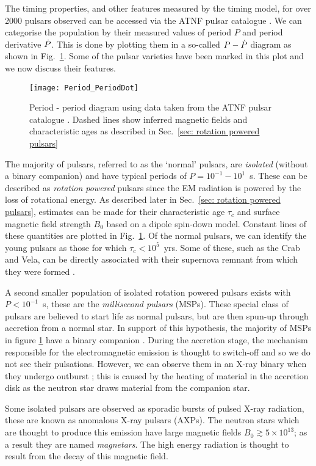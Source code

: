 The timing properties, and other features measured by the timing model, for
over 2000 pulsars observed can be accessed via the ATNF pulsar catalogue
\citep{ATNF}.  We can categorise the population by their measured values of
period $P$ and period derivative $\dot{P}$. This is done by plotting them in a
so-called $P - \dot{P}$ diagram as shown in Fig.~\ref{fig: Period_PeriodDot}.
Some of the pulsar varieties have been marked in this plot and we now discuss
their features.

\begin{figure}[hb]
    \centering
    \texttt{[image: Period\_PeriodDot]}
    \caption{Period - period diagram using data taken from the ATNF pulsar
             catalogue \citep{ATNF}. Dashed lines show inferred magnetic fields
             and characteristic ages as described in Sec.~\ref{sec: rotation
             powered pulsars}}
    \label{fig: Period_PeriodDot}
\end{figure}

The majority of pulsars, referred to as the `normal' pulsars, are
\emph{isolated} (without a binary companion) and have typical periods of
$P=10^{-1}-10^{1}$~s. These can be described as \emph{rotation powered} pulsars
since the EM radiation is powered by the loss of rotational energy. As
described later in Sec.~\ref{sec: rotation powered pulsars}, estimates can be made
for their characteristic age $\tau_{c}$ and surface magnetic field strength
$B_{0}$ based on a dipole spin-down model. Constant lines of these quantities
are plotted in Fig.~\ref{fig: Period_PeriodDot}. Of the normal pulsars, we
can identify the young pulsars as those for which $\tau_{c}<10^{5}$~yrs. Some
of these, such as the Crab and Vela, can be directly associated with their
supernova remnant from which they were formed \citep{Kaspi1996}.

A second smaller population of isolated rotation powered pulsars exists with
$P<10^{-1}$~s, these are the \emph{millisecond pulsars} (MSPs). These special
class of pulsars are believed to start life as normal pulsars, but are then
spun-up through accretion from a normal star. In support of this hypothesis,
the majority of MSPs in figure \ref{fig: Period_PeriodDot} have a binary
companion \citep{wijnands1998millisecond}.  During the accretion stage, the
mechanism responsible for the electromagnetic emission is thought to switch-off
and so we do not see their pulsations. However, we can observe them in an X-ray
binary when they undergo outburst \citep{lewin1997x}; this is caused by the
heating of material in the accretion disk as the neutron star draws material
from the companion star.

Some isolated pulsars are observed as sporadic bursts of pulsed X-ray radiation,
these are known as anomalous X-ray pulsars (AXPs). The neutron stars which are
thought to produce this emission have large magnetic fields $B_{0}\gtrsim
5\times10^{13}$; as a result they are named \emph{magnetars}. The high energy
radiation is thought to result from the decay of this magnetic field.
